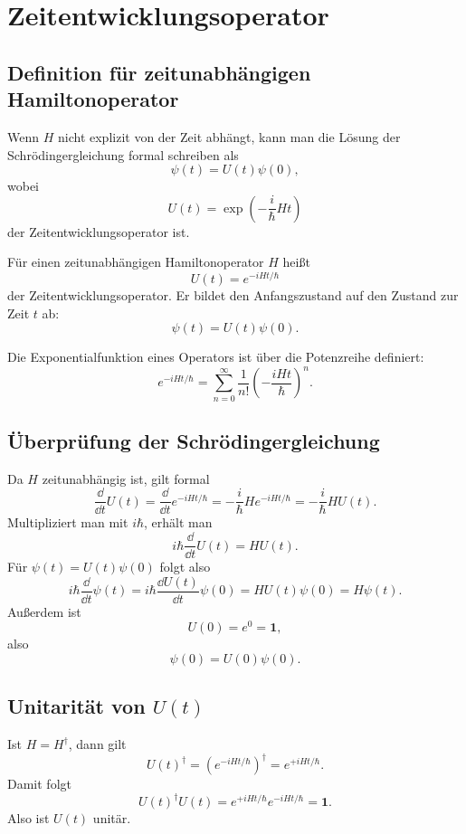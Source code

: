 \section{Zeitentwicklungsoperator}

\subsection{Definition für zeitunabhängigen Hamiltonoperator}

Wenn $H$ nicht explizit von der Zeit abhängt, kann man die Lösung der Schrödingergleichung formal schreiben als
\[
    \psi(t)=U(t)\psi(0),
\]
wobei
\[
    U(t)=\exp\left(-\frac{i}{\hbar}Ht\right)
\]
der Zeitentwicklungsoperator ist.

\begin{definitionbox}
Für einen zeitunabhängigen Hamiltonoperator $H$ heißt
\[
    U(t)=e^{-iHt/\hbar}
\]
der Zeitentwicklungsoperator. Er bildet den Anfangszustand auf den Zustand zur Zeit $t$ ab:
\[
    \psi(t)=U(t)\psi(0).
\]
\end{definitionbox}

Die Exponentialfunktion eines Operators ist über die Potenzreihe definiert:
\[
    e^{-iHt/\hbar}
    =\sum_{n=0}^{\infty}\frac{1}{n!}\left(-\frac{iHt}{\hbar}\right)^n.
\]

\subsection{Überprüfung der Schrödingergleichung}

\begin{derivationbox}
Da $H$ zeitunabhängig ist, gilt formal
\[
    \frac{\dd}{\dd t}U(t)
    =\frac{\dd}{\dd t}e^{-iHt/\hbar}
    =-\frac{i}{\hbar}H e^{-iHt/\hbar}
    =-\frac{i}{\hbar}HU(t).
\]
Multipliziert man mit $i\hbar$, erhält man
\[
    i\hbar\frac{\dd}{\dd t}U(t)=HU(t).
\]
Für $\psi(t)=U(t)\psi(0)$ folgt also
\[
    i\hbar\frac{\dd}{\dd t}\psi(t)
    =i\hbar\frac{\dd U(t)}{\dd t}\psi(0)
    =HU(t)\psi(0)
    =H\psi(t).
\]
Außerdem ist
\[
    U(0)=e^0=\mathbf{1},
\]
also
\[
    \psi(0)=U(0)\psi(0).
\]
\end{derivationbox}

\subsection{Unitarität von $U(t)$}

Ist $H=H^\dagger$, dann gilt
\[
    U(t)^\dagger
    =\left(e^{-iHt/\hbar}\right)^\dagger
    =e^{+iHt/\hbar}.
\]
Damit folgt
\[
    U(t)^\dagger U(t)
    =e^{+iHt/\hbar}e^{-iHt/\hbar}
    =\mathbf{1}.
\]
Also ist $U(t)$ unitär.

